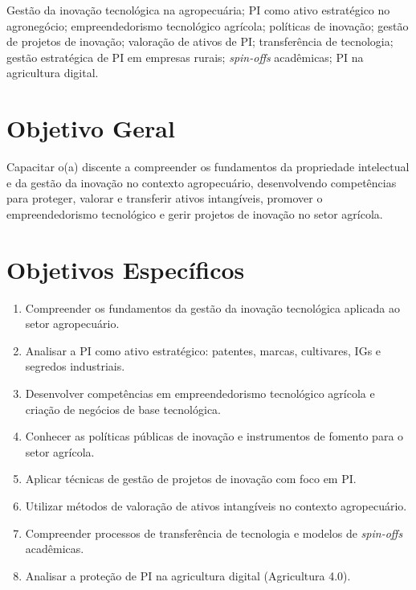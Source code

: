 \documentclass[11pt,a4paper]{article}
\begin{document}
\begin{tcolorbox}[ementabox]
Gestão da inovação tecnológica na agropecuária; PI como ativo estratégico no agronegócio; empreendedorismo tecnológico agrícola; políticas de inovação; gestão de projetos de inovação; valoração de ativos de PI; transferência de tecnologia; gestão estratégica de PI em empresas rurais; \textit{spin-offs} acadêmicas; PI na agricultura digital.
\end{tcolorbox}


\section*{Objetivo Geral}

Capacitar o(a) discente a compreender os fundamentos da propriedade intelectual e da gestão da inovação no contexto agropecuário, desenvolvendo competências para proteger, valorar e transferir ativos intangíveis, promover o empreendedorismo tecnológico e gerir projetos de inovação no setor agrícola.

\section*{Objetivos Específicos}

\begin{enumerate}

\item Compreender os fundamentos da gestão da inovação tecnológica aplicada ao setor agropecuário.

\item Analisar a PI como ativo estratégico: patentes, marcas, cultivares, IGs e segredos industriais.

\item Desenvolver competências em empreendedorismo tecnológico agrícola e criação de negócios de base tecnológica.

\item Conhecer as políticas públicas de inovação e instrumentos de fomento para o setor agrícola.

\item Aplicar técnicas de gestão de projetos de inovação com foco em PI.

\item Utilizar métodos de valoração de ativos intangíveis no contexto agropecuário.

\item Compreender processos de transferência de tecnologia e modelos de \textit{spin-offs} acadêmicas.

\item Analisar a proteção de PI na agricultura digital (Agricultura 4.0).

\end{enumerate}
\end{document}
